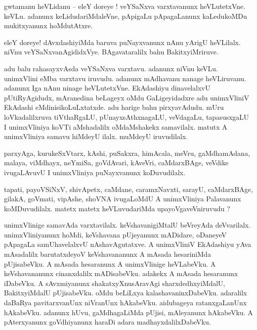 \documentclass{article}
\begin{document}
\begin{mn}%
gwtamanu heVLidanu -- eleY doreye ! veYSaNxva varxtavanunx heVLutetxVne. keVLu. adanunx 
keLidudariMdaleVne, pApigaLu pApagaLanunx kaLedukoMDu mukitxyanunx hoMdutAtxre.
\end{mn}

\begin{mn}%
eleY doreye! dAvxdashiyiMda baruva puNayxvanunx nAnu yArigU heVLilalx. niVnu veYSaNxvanAgididxVye. 
BAgavataralilx bahu BakitxyiMriruve.
\end{mn}

\begin{mn}%
adu balu rahasayxvAsda veYSaNxva varxtavu. adanunx niVnu keVLu. unimxVlini eMba varxtavu iruvudu. 
adanunx mAdhavanu nanage heVLiruvanu. adanunx Iga nAnu ninage heVLutetxVne. EkAdashiyu 
dinavelalxvU pUtiRyAgidudx, mAranedina beLageyx oMdu GaLigeyidadxre adu unimxVliniV EkAdashi 
eMdinisikoLuLxtatxde. adu harige bahu pirxyavAdudu. mUru loVkadalilxruva tiVthaRgaLU, 
pUnayxsAthxnagaLU, veVdagaLu, tapasusxgaLU I unimxVliniya koVTi aMshadalilx oMdaMshakekx 
samavilalx. matutx A unimxVliniya samavu hiMdeyU ilalx. muMdeyU iruvudilalx.
\end{mn}

\begin{mn}%
parxyAga, kurukeSxVtarx, kAshi, puSakxra, himAcala, meVru, gaMdhamAdana, malaya, viMdhayx, neYmiSa, 
goVdAvari, kAveVri, caMdarxBAge, veVdike ivugaLAvuvU I unimxVliniya puNayxvanunx koDuvudilalx.
\end{mn}

\begin{mn}%
tapati, payoVSiNxV, shivApetx, caMdane, caramxNavxti, sarayU, caMdarxBAge, gilakA, goVmati, 
vipAshe, shoVNA ivugaLoMdU A unimxVliniya Palavanunx koMDuvudilalx. matetx matetx heVLuvudariMda 
upayoVgaveVniruvudu ?
\end{mn}

\begin{mn}%
unimxVlinige samavAda varxtavilalx. keVshavanigiMtalU beVreyAda deVvarilalx. unimxVliniyanunx 
hoMdi, keVshavana pUjeyanunx mADidare, oDaneyeV pApagaLa samUhavelalxvU nAshavAgutatxve. A 
unimxVliniV EkAdashiyu yAva mAsadalilx barutatxdeyoV keVshavananunx A mAsada hesariniMda 
pUjisabeVku. A mAsada hesaranunx A unimxVlinige heVLabeVku. A keVshavananunx cinanxdalilx 
mADisabeVku. adakekx A mAsada hesaranunx iDabeVku. A sAvxmiyanunx shakatxyXnusAravAgi 
sharxdedhxyiMdalU, BakitxyiMdalU pUjisabeVku. oMdu beLiLxya kalashavaninxDabeVku. adaralilx 
daBaRya pavitarxvanUnx niVranUnx hAkabeVku. aidubageya ratanxgaLanUnx hAkabeVku. adanunx hUvu, 
gaMdhagaLiMda pUjisi, mAleyanunx hAkabeVku. A pAterxyanunx goVdhiyanunx haraDi adara 
madhayxdalilxDabeVku.
\end{mn}
\end{document}
